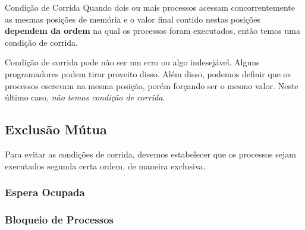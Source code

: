 \begin{definicao}{Condição de Corrida}
  Quando dois ou mais processos acessam concorrentemente as mesmas posições de memória e o valor final contido nestas posições \textbf{dependem da ordem} na qual os processos foram executados, então temos uma condição de corrida.
\end{definicao}

Condição de corrida pode não ser um erro ou algo indesejável. Alguns programadores podem tirar proveito disso. Além disso, podemos definir que os processos escrevam na mesma posição, porém forçando ser o mesmo valor. Neste último caso, \textit{não temos condição de corrida}.


\subsection{Exclusão Mútua}
Para evitar as condições de corrida, devemos estabelecer que os processos sejam executados segunda certa ordem, de maneira exclusiva.

\subsubsection{Espera Ocupada}

\subsubsection{Bloqueio de Processos}
